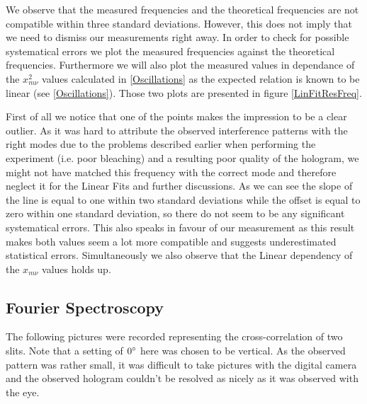 We observe that the measured frequencies and the theoretical frequencies are not compatible within three standard deviations. However, this does not imply that we need to dismiss our measurements right away. In order to check for possible systematical errors we plot the measured frequencies against the theoretical frequencies. Furthermore we will also plot the measured values in dependance of the $x_{m\nu}^2$ values calculated in \ref{Oscillations} as the expected relation is known to be linear (see \ref{Oscillations}). Those two plots are presented in figure \ref{LinFitResFreq}.


First of all we notice that one of the points makes the impression to be a clear outlier. As it was hard to attribute the observed interference patterns with the right modes due to the problems described earlier when performing the experiment (i.e. poor bleaching) and a resulting poor quality of the hologram, we might not have matched this frequency with the correct mode and therefore neglect it for the Linear Fits and further discussions.
As we can see the slope of the line is equal to one within two standard deviations while the offset is equal to zero within one standard deviation, so there do not seem to be any significant systematical errors. This also speaks in favour of our measurement as this result makes both values seem a lot more compatible and suggests underestimated statistical errors. Simultaneously we also observe that the Linear dependency of the $x_{m\nu}$ values holds up. 


\subsection{Fourier Spectroscopy}

The following pictures were recorded representing the cross-correlation of two slits. Note that a setting of $0^\circ$ here was chosen to be vertical. As the observed pattern was rather small, it was difficult to take pictures with the digital camera and the observed hologram couldn't be resolved as nicely as it was observed with the eye.


